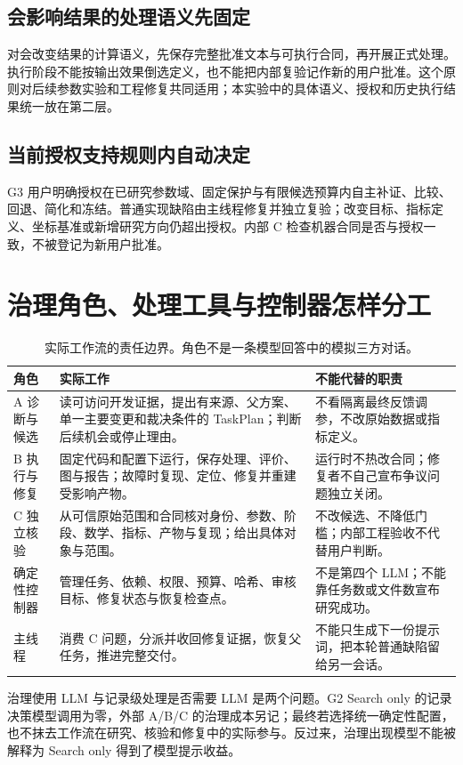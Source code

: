 \documentclass[11pt,a4paper]{article}
\begin{document}
\subsection{会影响结果的处理语义先固定}
对会改变结果的计算语义，先保存完整批准文本与可执行合同，再开展正式处理。执行阶段不能按输出效果倒选定义，也不能把内部复验记作新的用户批准。这个原则对后续参数实验和工程修复共同适用；本实验中的具体语义、授权和历史执行结果统一放在第二层。

\subsection{当前授权支持规则内自动决定}
G3 用户明确授权在已研究参数域、固定保护与有限候选预算内自主补证、比较、回退、简化和冻结。普通实现缺陷由主线程修复并独立复验；改变目标、指标定义、坐标基准或新增研究方向仍超出授权。内部 C 检查机器合同是否与授权一致，不被登记为新用户批准。

\section{治理角色、处理工具与控制器怎样分工}
\begin{table}[H]\centering\small\caption{实际工作流的责任边界。角色不是一条模型回答中的模拟三方对话。}\begin{tabularx}{\linewidth}{@{}p{22mm}Y Y@{}}\toprule 角色 & 实际工作 & 不能代替的职责 \\ \midrule
A 诊断与候选 & 读可访问开发证据，提出有来源、父方案、单一主要变更和裁决条件的 TaskPlan；判断后续机会或停止理由。 & 不看隔离最终反馈调参，不改原始数据或指标定义。 \\
B 执行与修复 & 固定代码和配置下运行，保存处理、评价、图与报告；故障时复现、定位、修复并重建受影响产物。 & 运行时不热改合同；修复者不自己宣布争议问题独立关闭。 \\
C 独立核验 & 从可信原始范围和合同核对身份、参数、阶段、数学、指标、产物与复现；给出具体对象与范围。 & 不改候选、不降低门槛；内部工程验收不代替用户判断。 \\
确定性控制器 & 管理任务、依赖、权限、预算、哈希、审核目标、修复状态与恢复检查点。 & 不是第四个 LLM；不能靠任务数或文件数宣布研究成功。 \\
主线程 & 消费 C 问题，分派并收回修复证据，恢复父任务，推进完整交付。 & 不能只生成下一份提示词，把本轮普通缺陷留给另一会话。 \\
\bottomrule\end{tabularx}\end{table}

治理使用 LLM 与记录级处理是否需要 LLM 是两个问题。G2 Search only 的记录决策模型调用为零，外部 A/B/C 的治理成本另记；最终若选择统一确定性配置，也不抹去工作流在研究、核验和修复中的实际参与。反过来，治理出现模型不能被解释为 Search only 得到了模型提示收益。
\end{document}
